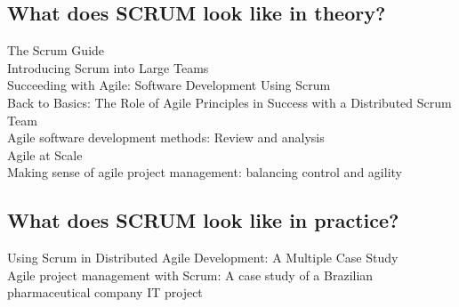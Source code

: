 \subsection*{What does SCRUM look like in theory?}

The Scrum Guide\citep{Schwaber2011Tsg}\\
Introducing Scrum into Large Teams\citep{Maximini2018ISi}\\
Succeeding with Agile: Software Development Using Scrum\citep{Cohn2010Swa}\\
Back to Basics: The Role of Agile Principles in Success with a Distributed Scrum Team\citep{Berczuk2007Btb}\\
Agile software development methods: Review and analysis\citep{Abrahamsson2017Asd}\\
Agile at Scale\citep{Rigby2018AaS}\\
Making sense of agile project management: balancing control and agility\citep{Cobb2011Mso}\\

\subsection*{What does SCRUM look like in practice?}

Using Scrum in Distributed Agile Development: A Multiple Case Study\citep{Paasivaara2009Usi}\\
Agile project management with Scrum: A case study of a Brazilian pharmaceutical company IT project\citep{Azanha2017Apm}\\